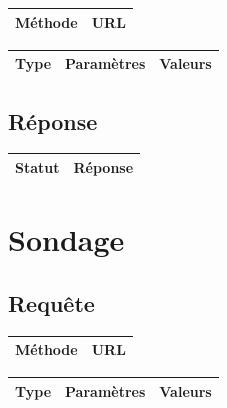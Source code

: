 \documentclass[titlepage]{report}
\begin{document}
\begin{center}
	\begin{tabular}{|c|c|}
		\hline
		Méthode & URL \\
		\hline
		
	\end{tabular}
\end{center}


\begin{center}
	\begin{tabular}{|c|c|c|}
		\hline
		Type & Paramètres & Valeurs \\
		\hline
		
	\end{tabular}
\end{center}


\section{Réponse}

\begin{center}
	\begin{tabular}{|c|c|}
		\hline
		Statut & Réponse \\
		\hline
		
	\end{tabular}
\end{center}


\chapter{Sondage}

\section{Requête}

\begin{center}
	\begin{tabular}{|c|c|}
		\hline
		Méthode & URL \\
		\hline
		
	\end{tabular}
\end{center}


\begin{center}
	\begin{tabular}{|c|c|c|}
		\hline
		Type & Paramètres & Valeurs \\
		\hline
		
	\end{tabular}
\end{center}
\end{document}
